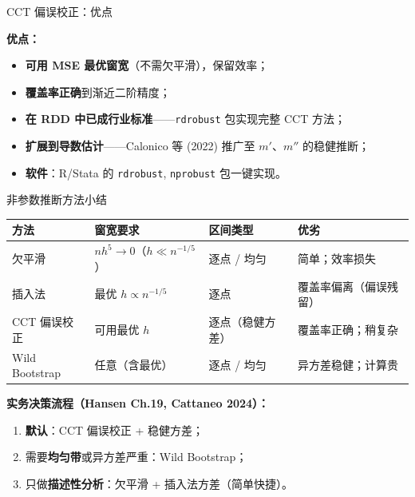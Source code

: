 \documentclass[aspectratio=169, 10pt]{beamer}
\renewcommand{\arraystretch}{1.05}
\begin{document}
\begin{frame}{CCT 偏误校正：优点}

  \begin{keybox}
    \textbf{优点：}
    \begin{itemize}
      \item \textbf{可用 MSE 最优窗宽}（不需欠平滑），保留效率；
      \item \textbf{覆盖率正确}到渐近二阶精度；
      \item \textbf{在 RDD 中已成行业标准}——\texttt{rdrobust} 包实现完整 CCT 方法；
      \item \textbf{扩展到导数估计}——Calonico 等 (2022) 推广至 $m'$、$m''$ 的稳健推断；
      \item \textbf{软件}：R/Stata 的 \texttt{rdrobust}, \texttt{nprobust} 包一键实现。
    \end{itemize}
  \end{keybox}

\end{frame}


\begin{frame}{非参数推断方法小结}
  \centering\small
  \renewcommand{\arraystretch}{1.25}
  \begin{tabular}{@{}p{2.8cm}p{3.3cm}p{3.0cm}p{4.0cm}@{}}
    \toprule
    \textbf{方法} & \textbf{窗宽要求} & \textbf{区间类型} & \textbf{优劣} \\
    \midrule
    欠平滑 & $nh^5\to 0$（$h \ll n^{-1/5}$） & 逐点 / 均匀 & 简单；效率损失\\
    插入法 & 最优 $h \propto n^{-1/5}$ & 逐点 & 覆盖率偏离（偏误残留）\\
    CCT 偏误校正 & 可用最优 $h$ & 逐点（稳健方差） & 覆盖率正确；稍复杂 \\
    Wild Bootstrap & 任意（含最优） & 逐点 / 均匀 & 异方差稳健；计算贵 \\
    \bottomrule
  \end{tabular}


  \begin{keybox}
    \textbf{实务决策流程（Hansen Ch.19, Cattaneo 2024）：}
    \begin{enumerate}
      \item \textbf{默认}：CCT 偏误校正 + 稳健方差；
      \item 需要\textbf{均匀带}或异方差严重：Wild Bootstrap；
      \item 只做\textbf{描述性分析}：欠平滑 + 插入法方差（简单快捷）。
    \end{enumerate}
  \end{keybox}

\end{frame}
\end{document}
